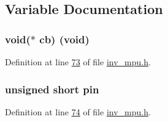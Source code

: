 \subsection{Variable Documentation}
\subsubsection[{\texorpdfstring{cb}{cb}}]{\setlength{\rightskip}{0pt plus 5cm}void($\ast$ cb) (void)}\hypertarget{group___d_r_i_v_e_r_s_ga574999a803893e57b48324e39a5daa19}{}\label{group___d_r_i_v_e_r_s_ga574999a803893e57b48324e39a5daa19}


Definition at line \hyperlink{inv__mpu_8h_source_l00073}{73} of file \hyperlink{inv__mpu_8h_source}{inv\+\_\+mpu.\+h}.

\subsubsection[{\texorpdfstring{pin}{pin}}]{\setlength{\rightskip}{0pt plus 5cm}unsigned short pin}\hypertarget{group___d_r_i_v_e_r_s_ga503508a7ee88d8566cb3c882db1311b2}{}\label{group___d_r_i_v_e_r_s_ga503508a7ee88d8566cb3c882db1311b2}


Definition at line \hyperlink{inv__mpu_8h_source_l00074}{74} of file \hyperlink{inv__mpu_8h_source}{inv\+\_\+mpu.\+h}.

